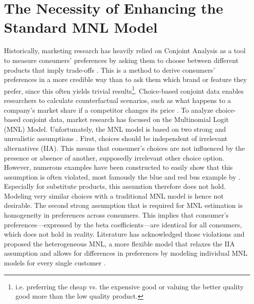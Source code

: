\documentclass[12pt,a4paper]{article}
\begin{document}
\section{The Necessity of Enhancing the Standard MNL Model} \label{sec_motivation}
Historically, marketing research has heavily relied on Conjoint Analysis as a tool to measure consumers' preferences by asking them to choose between different products that imply trade-offs \citep{greenConjointAnalysisMarketing1990}.
This is a method to derive consumers' preferences in a more credible way than to ask them which brand or feature they prefer,
since this often yields trivial results\footnote{i.e. preferring the cheap vs. the expensive good or valuing the better quality good more than the low quality product.}.
Choice-based conjoint data enables researchers to calculate counterfactual scenarios, such as what happens to a company's market share if a competitor changes its price \citep{huberDealingProductSimilarity2001}.
To analyze choice-based conjoint data, market research has focused on the Multinomial Logit (MNL) Model.
Unfortunately, the MNL model is based on two strong and unrealistic assumptions \citep{elrodEmpiricalComparisonRatingsBased1992}.
First, choices should be independent of irrelevant alternatives (IIA).
This means that consumer's choices are not influenced by the presence or absence of another, supposedly irrelevant other choice option.
However, numerous examples have been constructed to easily show that this assumption is often violated, most famously the blue and red bus example by \cite{mcfaddenConditionalLogitAnalysis1973}.
Especially for substitute products, this assumtion therefore does not hold. 
Modeling very similar choices with a traditional MNL model is hence not desirable.
The second strong assumption that is required for MNL estimation is homogeneity in preferences across consumers.
This implies that consumer's preferences---expressed by the beta coefficients---are identical for all consumers, which does not hold in reality. Literature has acknowledged those violations and proposed the heterogeneous MNL, a more flexible model that relaxes the IIA assumption and allows for differences in preferences by modeling individual MNL models for every single customer \citep{steckelHeterogeneousConditionalLogit1988}.
\end{document}
